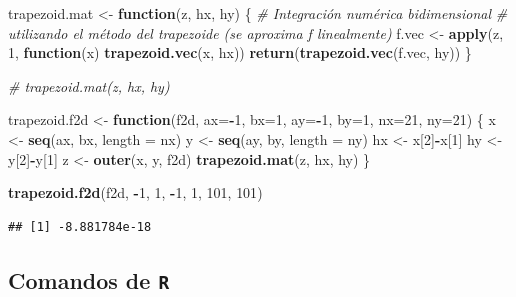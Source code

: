 \documentclass[]{book}
\newenvironment{Shaded}{\begin{snugshade}}{\end{snugshade}}
\newcommand{\KeywordTok}[1]{\textcolor[rgb]{0.13,0.29,0.53}{\textbf{#1}}}
\newcommand{\DataTypeTok}[1]{\textcolor[rgb]{0.13,0.29,0.53}{#1}}
\newcommand{\DecValTok}[1]{\textcolor[rgb]{0.00,0.00,0.81}{#1}}
\newcommand{\StringTok}[1]{\textcolor[rgb]{0.31,0.60,0.02}{#1}}
\newcommand{\CommentTok}[1]{\textcolor[rgb]{0.56,0.35,0.01}{\textit{#1}}}
\newcommand{\ControlFlowTok}[1]{\textcolor[rgb]{0.13,0.29,0.53}{\textbf{#1}}}
\newcommand{\OperatorTok}[1]{\textcolor[rgb]{0.81,0.36,0.00}{\textbf{#1}}}
\newcommand{\NormalTok}[1]{#1}
\theoremstyle{definition}
\theoremstyle{definition}
\theoremstyle{definition}
\theoremstyle{remark}
\begin{document}
\begin{Shaded}
\begin{Highlighting}[]
\NormalTok{trapezoid.mat <-}\StringTok{ }\ControlFlowTok{function}\NormalTok{(z, hx, hy) \{ }
\CommentTok{# Integración numérica bidimensional}
\CommentTok{# utilizando el método del trapezoide (se aproxima f linealmente)}
\NormalTok{  f.vec <-}\StringTok{ }\KeywordTok{apply}\NormalTok{(z, }\DecValTok{1}\NormalTok{, }\ControlFlowTok{function}\NormalTok{(x) }\KeywordTok{trapezoid.vec}\NormalTok{(x, hx))}
  \KeywordTok{return}\NormalTok{(}\KeywordTok{trapezoid.vec}\NormalTok{(f.vec, hy)) }
\NormalTok{\}}

\CommentTok{# trapezoid.mat(z, hx, hy) }

\NormalTok{trapezoid.f2d <-}\StringTok{ }\ControlFlowTok{function}\NormalTok{(f2d, }\DataTypeTok{ax=}\OperatorTok{-}\DecValTok{1}\NormalTok{, }\DataTypeTok{bx=}\DecValTok{1}\NormalTok{, }\DataTypeTok{ay=}\OperatorTok{-}\DecValTok{1}\NormalTok{, }\DataTypeTok{by=}\DecValTok{1}\NormalTok{, }\DataTypeTok{nx=}\DecValTok{21}\NormalTok{, }\DataTypeTok{ny=}\DecValTok{21}\NormalTok{) \{ }
\NormalTok{  x <-}\StringTok{ }\KeywordTok{seq}\NormalTok{(ax, bx, }\DataTypeTok{length =}\NormalTok{ nx)}
\NormalTok{  y <-}\StringTok{ }\KeywordTok{seq}\NormalTok{(ay, by, }\DataTypeTok{length =}\NormalTok{ ny)}
\NormalTok{  hx <-}\StringTok{ }\NormalTok{x[}\DecValTok{2}\NormalTok{]}\OperatorTok{-}\NormalTok{x[}\DecValTok{1}\NormalTok{]}
\NormalTok{  hy <-}\StringTok{ }\NormalTok{y[}\DecValTok{2}\NormalTok{]}\OperatorTok{-}\NormalTok{y[}\DecValTok{1}\NormalTok{]}
\NormalTok{  z <-}\StringTok{ }\KeywordTok{outer}\NormalTok{(x, y, f2d)}
  \KeywordTok{trapezoid.mat}\NormalTok{(z, hx, hy)}
\NormalTok{\}}

\KeywordTok{trapezoid.f2d}\NormalTok{(f2d, }\OperatorTok{-}\DecValTok{1}\NormalTok{, }\DecValTok{1}\NormalTok{, }\OperatorTok{-}\DecValTok{1}\NormalTok{, }\DecValTok{1}\NormalTok{, }\DecValTok{101}\NormalTok{, }\DecValTok{101}\NormalTok{) }
\end{Highlighting}
\end{Shaded}

\begin{verbatim}
## [1] -8.881784e-18
\end{verbatim}

\subsection{\texorpdfstring{Comandos de
\texttt{R}}{Comandos de R}}\label{comandos-de-r-1}
\end{document}
